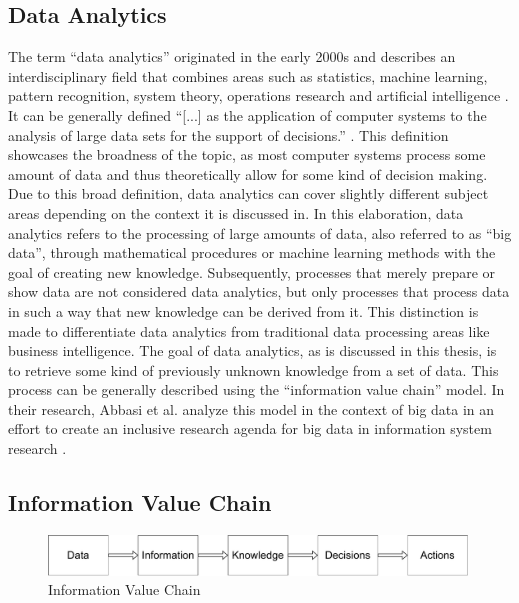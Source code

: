 \subsection{Data Analytics}

The term \enquote{data analytics} originated in the early 2000s and describes an interdisciplinary field that combines areas such as statistics, machine learning, pattern recognition, system theory, operations research and artificial intelligence \parencite{Runkler.2020}. It can be generally defined \enquote{[...] as the application of computer systems to the analysis of large data sets for the support of decisions.} \parencite{Runkler.2020}. This definition showcases the broadness of the topic, as most computer systems process some amount of data and thus theoretically allow for some kind of decision making. Due to this broad definition, data analytics can cover slightly different subject areas depending on the context it is discussed in. In this elaboration, data analytics refers to the processing of large amounts of data, also referred  to as \enquote{big data}, through mathematical procedures or machine learning methods with the goal of creating new knowledge. Subsequently, processes that merely prepare or show data are not considered data analytics, but only processes that process data in such a way that new knowledge can be derived from it. This distinction is made to differentiate data analytics from traditional data processing areas like business intelligence. The goal of data analytics, as is discussed in this thesis, is to retrieve some kind of previously unknown knowledge from a set of data. This process can be generally described using the \enquote{information value chain} model. In their research, Abbasi et al. analyze this model in the context of big data in an effort to create an inclusive research agenda for big data in information system research \parencite{Abbasi.2016}.

\subsection{Information Value Chain}
\label{subsec:informationValueChainSubSection}

\begin{figure}[]
    \includegraphics[width=0.99\textwidth, keepaspectratio]{content/02_theretical_foundations/informationValueChain.pdf}
    \caption{Information Value Chain}    
    \label{information_value_chain}
\end{figure}

